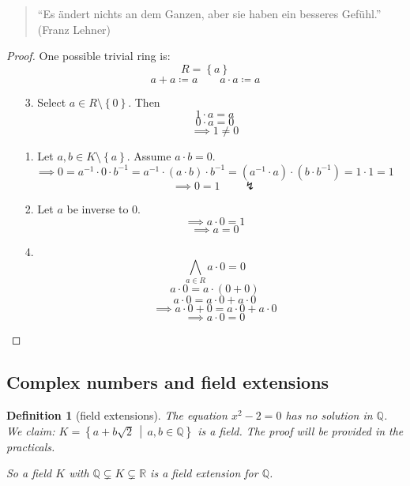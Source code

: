 \documentclass[a4paper,landscape,twocolumn]{article}
\newcommand\set[1]{\left\{#1\right\}}
\newcommand\setdef[2]{\left\{#1\,\middle|\,#2\right\}}
\newtheorem{defi}{Definition}[section]
\begin{document}
\begin{quote}
  \begin{otherlanguage}{ngerman}
    \enquote{Es ändert nichts an dem Ganzen, aber sie haben ein besseres Gefühl.}
    (Franz Lehner)
  \end{otherlanguage}
\end{quote}

\begin{proof}
  One possible trivial ring is:
  \[ R = \set{a} \]
  \[ a + a \coloneqq a \qquad a \cdot a \coloneqq a \]

  \begin{enumerate}
    \item[3.]
      Select $a \in R \setminus \set{0}$. Then
      \[ 1 \cdot a = a \]
      \[ 0 \cdot a = 0 \]
      \[ \implies 1 \neq 0 \]
    \item[1.]
      Let $a, b \in K \setminus \set{a}$.
      Assume $a \cdot b = 0$.
      \[
        \implies 0 = a^{-1} \cdot 0 \cdot b^{-1}
        = a^{-1} \cdot (a \cdot b) \cdot b^{-1}
        = (a^{-1} \cdot a) \cdot (b \cdot b^{-1})
        = 1 \cdot 1
        = 1
      \] \[ \implies 0 = 1 \qquad\lightning \]
    \item[2.]
      Let $a$ be inverse to $0$.
      \[ \implies a \cdot 0 = 1 \]
      \[ \implies a = 0 \]
    \item[4.]
      \[ \bigwedge_{a \in R} a \cdot 0 = 0 \]
      \[ a \cdot 0 = a \cdot (0 + 0) \]
      \[ a \cdot 0 = a \cdot 0 + a \cdot 0 \]
      \[ \implies a \cdot 0 + 0 = a \cdot 0 + a \cdot 0 \]
      \[ \implies a \cdot 0 = 0 \]
  \end{enumerate}
\end{proof}

\subsection{Complex numbers and field extensions}

\begin{defi}[field extensions]
  The equation $x^2 - 2 = 0$ has no solution in $\mathbb Q$.
  We claim:
  $K = \setdef{a + b \sqrt{2}}{a,b \in \mathbb Q}$ is a field.
  The proof will be provided in the practicals.

  So a field $K$ with $\mathbb Q \subsetneq K \subsetneq \mathbb R$
  is a field extension for $\mathbb Q$.
\end{defi}
\end{document}
